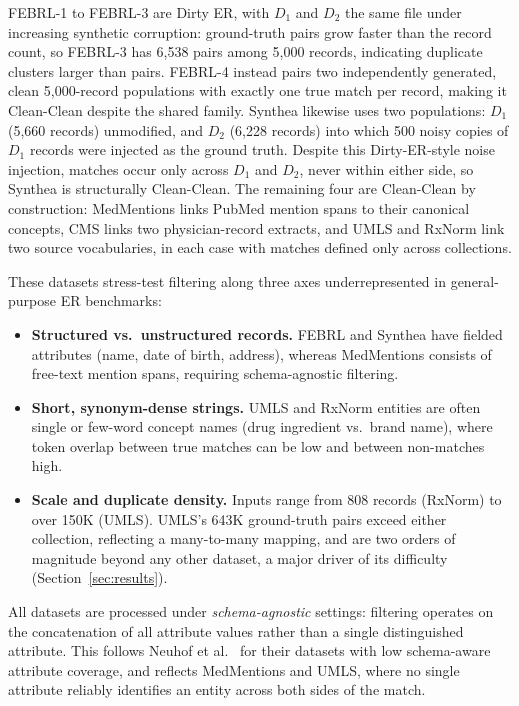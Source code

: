 \documentclass[runningheads]{llncs}
\begin{document}
FEBRL-1 to FEBRL-3 are Dirty ER, with $D_1$ and $D_2$ the same file under increasing synthetic corruption: ground-truth pairs grow faster than the record count, so FEBRL-3 has 6{,}538 pairs among 5{,}000 records, indicating duplicate clusters larger than pairs. FEBRL-4 instead pairs two independently generated, clean 5{,}000-record populations with exactly one true match per record, making it Clean-Clean despite the shared family. Synthea likewise uses two populations: $D_1$ (5{,}660 records) unmodified, and $D_2$ (6{,}228 records) into which 500 noisy copies of $D_1$ records were injected as the ground truth. Despite this Dirty-ER-style noise injection, matches occur only across $D_1$ and $D_2$, never within either side, so Synthea is structurally Clean-Clean. The remaining four are Clean-Clean by construction: MedMentions links PubMed mention spans to their canonical concepts, CMS links two physician-record extracts, and UMLS and RxNorm link two source vocabularies, in each case with matches defined only across collections.

These datasets stress-test filtering along three axes underrepresented in general-purpose ER
benchmarks:
\begin{itemize}
    \item \textbf{Structured vs.\ unstructured records.} FEBRL and Synthea have fielded
    attributes (name, date of birth, address), whereas MedMentions consists of free-text
    mention spans, requiring schema-agnostic filtering.
    \item \textbf{Short, synonym-dense strings.} UMLS and RxNorm entities are often single or
    few-word concept names (drug ingredient vs.\ brand name), where token overlap between true
    matches can be low and between non-matches high.
    \item \textbf{Scale and duplicate density.} Inputs range from 808 records (RxNorm) to over
    150K (UMLS). UMLS's 643K ground-truth pairs exceed either collection, reflecting a
    many-to-many mapping, and are two orders of magnitude beyond any other dataset, a major
    driver of its difficulty (Section~\ref{sec:results}).
\end{itemize}

All datasets are processed under \textit{schema-agnostic} settings: filtering operates on the concatenation of all attribute values rather than a single distinguished attribute. This
follows Neuhof et al.~\cite{neuhof2024open} for their datasets with low schema-aware attribute coverage, and reflects MedMentions and UMLS, where no single attribute reliably identifies an entity across both sides of the match.
\end{document}
